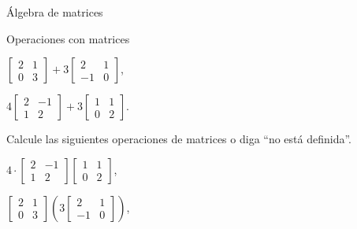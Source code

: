 \begin{chapter}{\'Algebra de matrices}
\begin{section}{Operaciones con matrices}
\begin{enumex}
\begin{enumex}
                    \begin{minipage}{0.45\textwidth}
                    \item $\begin{bmatrix}
                        2&1\\0&3
                    \end{bmatrix} + 3 \begin{bmatrix}
                        2&1\\-1&0
                    \end{bmatrix}$,
                    \end{minipage}
                    \begin{minipage}{0.4\textwidth}
                    \item $4\begin{bmatrix}
                        2&-1\\1&2
                    \end{bmatrix} + 3  \begin{bmatrix} 1&1\\0&2 \end{bmatrix}$. 
                    \end{minipage}
                \end{enumex}

            \item Calcule las siguientes operaciones de matrices o diga ``no está definida''.
                \begin{enumex}
                    \begin{minipage}{0.45\textwidth}
                    \item $4\cdot \begin{bmatrix}
                        2&-1\\1&2
                    \end{bmatrix}  \begin{bmatrix} 1&1\\0&2 \end{bmatrix}$,
                \end{minipage}
                \begin{minipage}{0.4\textwidth}
                    \item $\begin{bmatrix}
                        2&1\\0&3
                    \end{bmatrix}  \left(3 \begin{bmatrix}
                        2&1\\-1&0
                    \end{bmatrix}\right)$,
                \end{minipage}


\end{enumex}
\end{enumex}
\end{section}
\end{chapter}
